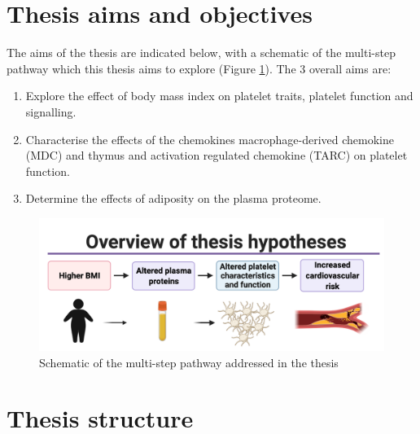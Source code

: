 \documentclass[11pt,twoside]{bristolthesis}
\providecommand{\tightlist}{%
  \setlength{\itemsep}{0pt}\setlength{\parskip}{0pt}}
\begin{document}
\hypertarget{thesis-aims-and-objectives}{%
\section{Thesis aims and objectives}\label{thesis-aims-and-objectives}}

The aims of the thesis are indicated below, with a schematic of the multi-step pathway which this thesis aims to explore (Figure \ref{fig:Thesis-schematic}). The 3 overall aims are:
\begin{enumerate}
\def\labelenumi{\arabic{enumi})}
\tightlist
\item
  Explore the effect of body mass index on platelet traits, platelet function and signalling.
\item
  Characterise the effects of the chemokines macrophage-derived chemokine (MDC) and thymus and activation regulated chemokine (TARC) on platelet function.
\item
  Determine the effects of adiposity on the plasma proteome.
\end{enumerate}
\begin{figure}
\includegraphics{figure/Intro_background/Thesis_graphic_overview_without_chapters} \caption[Schematic of the multi-step pathway addressed in the thesis]{Schematic of the multi-step pathway addressed in the thesis}\label{fig:Thesis-schematic}
\end{figure}
\hypertarget{thesis-structure}{%
\section{Thesis structure}\label{thesis-structure}}
\end{document}
